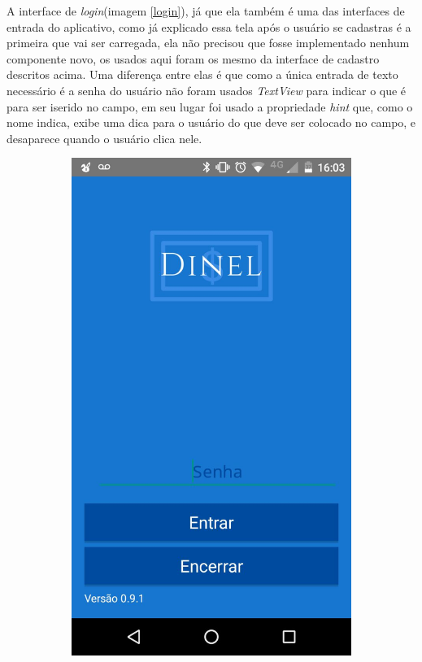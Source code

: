 \documentclass[hidelinks,12pt]{article}
\begin{document}
A interface de \textit{login}(imagem \ref{login}), j\'a que ela tamb\'em \'e uma das interfaces de entrada do aplicativo, como já explicado essa tela ap\'os o usu\'ario se cadastras \'e a primeira que vai ser carregada, ela n\~ao precisou que fosse implementado nenhum componente novo, os usados aqui foram os mesmo da interface de cadastro descritos acima. Uma diferen\c{c}a entre elas \'e que como a única entrada de texto necess\'ario \'e a senha do usu\'ario n\~ao foram usados \textit{TextView} para indicar o que \'e para ser iserido no campo, em seu lugar foi usado a propriedade \textit{hint} que, como o nome indica, exibe uma dica para o usu\'ario do que deve ser colocado no campo, e desaparece quando o usu\'ario clica nele.
\begin{figure}[H]
	\begin{subfigure}{0.5\textwidth}
		\includegraphics[scale=0.3]{login} 

\end{subfigure}
\end{figure}
\end{document}
